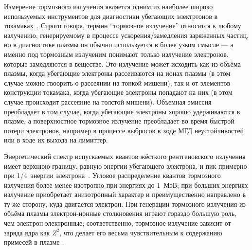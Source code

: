 Измерение тормозного излучения является одним из наиболее широко используемых инструментов для диагностики убегающих электртонов в токамаках~\cite{Breizman2019,Cooper2016,Shevelev2013,Chugunov2011}. Строго говоря, термин  ``тормозное излучение'' относится к любому излучению, генерируемому в процессе ускорения/замедления заряженных частиц, но в диагностике плазмы он обычно используется в более узком смысле --- а именно под тормозным излученим понимают только излучение электронов, которые замедляются в веществе. Это излучение может исходить как из объёма плазмы, когда убегающие электроны рассеиваются на ионах плазмы (в этом случае можно гвоорить о рассеянии на тонкой мишени), так и от элементов конструкции токамака, когда убегающие электроны попадают на них (в этом случае происходит рассеяние на толстой мишени). Объемная эмиссия преобладает в том случае, когда убегающие электроны хорошо удерживаются в плазме, а поверхностное тормозное излучение преобладает во время быстрой потери электронов, например в процессе выбросов в ходе МГД неустойчивостей или в ходе их выхода на лимиттер.~\cite{Breizman2019}

Энергетический спектр испускаемых квантов жёсткого рентгеновского излучения имеет верхнюю границу, равную энергии убегающего электрона, и пик примерно при 1/4~энергии электрона~\cite{Seltzer1985,Kuznetsov1974,Shevelev2013}. Угловое распределение квантов тормозного излучения более-менее изотропно при энергиях до 1~МэВ; при больших энергиях излучение приобретает анизотропный характер и преимущественно направлено в ту же сторону, куда двигается электрон. При генерации тормозного излучения из объёма плазмы электрон-ионные столкновения играют гораздо большую роль, чем электрон-электронные; соответственно, тормозное излучение зависит от заряда ядра как $Z^2$, что делает его весьма чувствительным к содержанию примесей в плазме~\cite{Seltzer1985,Breizman2019}.

